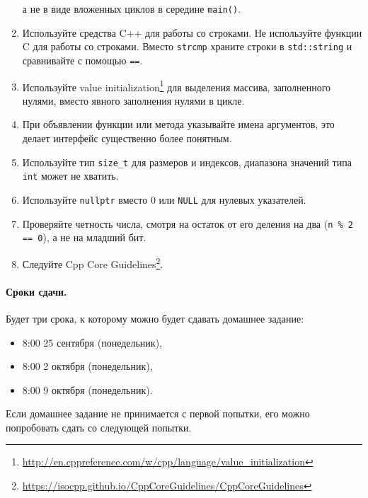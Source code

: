 \documentclass[a4paper,10pt]{article}
\begin{document}
\begin{enumerate}
    а не в виде вложенных циклов в середине {\tt main()}.
    \item Используйте средства C++ для работы со строками.
    Не используйте функции C для работы со строками.
    Вместо {\tt strcmp} храните строки в {\tt std::string} и сравнивайте с помощью {\tt ==}.
    \item Используйте value initialization\footnote{\url{http://en.cppreference.com/w/cpp/language/value_initialization}}
    для выделения массива, заполненного нулями, вместо явного заполнения нулями в цикле.
    \item При объявлении функции или метода указывайте имена аргументов,
    это делает интерфейс существенно более понятным.
    \item Используйте тип {\tt size_t} для размеров и индексов,
    диапазона значений типа {\tt int} может не хватить.
    \item Используйте {\tt nullptr} вместо {0} или {\tt NULL} для нулевых указателей.
    \item Проверяйте четность числа, смотря на остаток от его деления на два
    ({\tt n \% 2 == 0}), а не на младший бит.
    \item Следуйте Cpp Core Guidelines\footnote{\url{https://isocpp.github.io/CppCoreGuidelines/CppCoreGuidelines}}.
\end{enumerate}

\paragraph{Сроки сдачи.}
Будет три срока, к которому можно будет сдавать домашнее задание:
\begin{itemize}
    \item 8:00 25 сентября (понедельник),
    \item 8:00 2 октября (понедельник),
    \item 8:00 9 октября (понедельник).
\end{itemize}
Если домашнее задание не принимается с первой попытки, его
можно попробовать сдать со следующей попытки.
\end{document}
